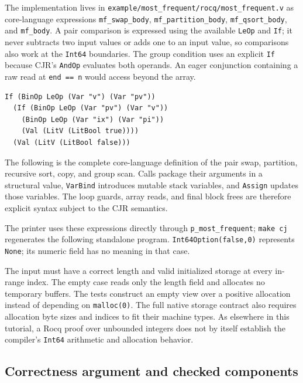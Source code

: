 The implementation lives in \texttt{example/most\_frequent/rocq/most\_frequent.v}
as core-language expressions \texttt{mf\_swap\_body},
\texttt{mf\_partition\_body}, \texttt{mf\_qsort\_body}, and
\texttt{mf\_body}. A pair comparison is expressed using the available
\texttt{LeOp} and \texttt{If}; it never subtracts two input values or adds
one to an input value, so comparisons also work at the \texttt{Int64}
boundaries. The group condition uses an explicit \texttt{If} because CJR's
\texttt{AndOp} evaluates both operands. An eager conjunction containing a
raw read at \texttt{end == n} would access beyond the array.

\begin{lstlisting}
If (BinOp LeOp (Var "v") (Var "pv"))
  (If (BinOp LeOp (Var "pv") (Var "v"))
    (BinOp LeOp (Var "ix") (Var "pi"))
    (Val (LitV (LitBool true))))
  (Val (LitV (LitBool false)))
\end{lstlisting}
The following is the complete core-language definition of the pair swap,
partition, recursive sort, copy, and group scan. Calls package their
arguments in a structural value, \texttt{VarBind} introduces mutable stack
variables, and \texttt{Assign} updates those variables. The loop guards,
array reads, and final block frees are therefore explicit syntax subject
to the CJR semantics.


The printer uses these expressions directly through
\texttt{p\_most\_frequent}; \texttt{make cj} regenerates the following
standalone program. \texttt{Int64Option(false,0)} represents
\texttt{None}; its numeric field has no meaning in that case.


The input must have a correct length and valid initialized storage at
every in-range index. The empty case reads only the length field and
allocates no temporary buffers. The tests construct an empty view over a
positive allocation instead of depending on \texttt{malloc(0)}. The full
native storage contract also requires allocation byte sizes and indices
to fit their machine types. As elsewhere in this tutorial, a Rocq proof
over unbounded integers does not by itself establish the compiler's
\texttt{Int64} arithmetic and allocation behavior.

\subsection{Correctness argument and checked components}

